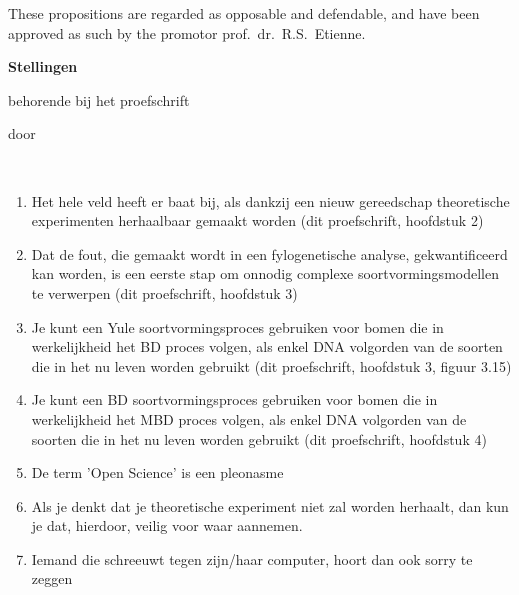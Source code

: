 \documentclass{propositions}
\begin{document}
\bigskip
\bigskip

\begin{center}
These propositions are regarded as opposable and defendable, 
and have been approved as such by the promotor prof.\ dr.\ R.S.\ Etienne.
\end{center}

\clearpage
{

\begin{center}

{\Large\titlefont\bfseries Stellingen}

\bigskip

behorende bij het proefschrift

\bigskip

{\makeatletter
\titlestyle\bfseries\large\@title
\makeatother}

{\makeatletter
\ifx\@subtitle\undefined\else
    \titlefont\titleshape\@subtitle
\fi
\makeatother}

\bigskip

door

\bigskip

\makeatletter
{\large\titlefont\bfseries\@firstname\ {\titleshape\@lastname}}
\makeatother

\end{center}

\bigskip
\bigskip

\begin{enumerate}
  \item Het hele veld heeft er baat bij, als dankzij een nieuw 
        gereedschap theoretische experimenten herhaalbaar gemaakt worden 
        (dit proefschrift, hoofdstuk 2)
  \item Dat de fout, die gemaakt wordt in een fylogenetische analyse,
        gekwantificeerd kan worden, is een eerste
        stap om onnodig complexe soortvormingsmodellen te verwerpen
        (dit proefschrift, hoofdstuk 3)
  \item Je kunt een Yule soortvormingsproces gebruiken
        voor bomen die in werkelijkheid het BD proces volgen,
        als enkel DNA volgorden van de soorten die in het nu
        leven worden gebruikt 
        (dit proefschrift, hoofdstuk 3, figuur 3.15)
  \item Je kunt een BD soortvormingsproces gebruiken
        voor bomen die in werkelijkheid het MBD proces volgen,
        als enkel DNA volgorden van de soorten die in het nu
        leven worden gebruikt (dit proefschrift, hoofdstuk 4)
  \item De term 'Open Science' is een pleonasme
  \item Als je denkt dat je theoretische experiment niet zal worden herhaalt,
        dan kun je dat, hierdoor, veilig voor waar aannemen.
  \item Iemand die schreeuwt tegen zijn/haar computer, hoort dan ook sorry te zeggen
\end{enumerate}

}
\end{document}
